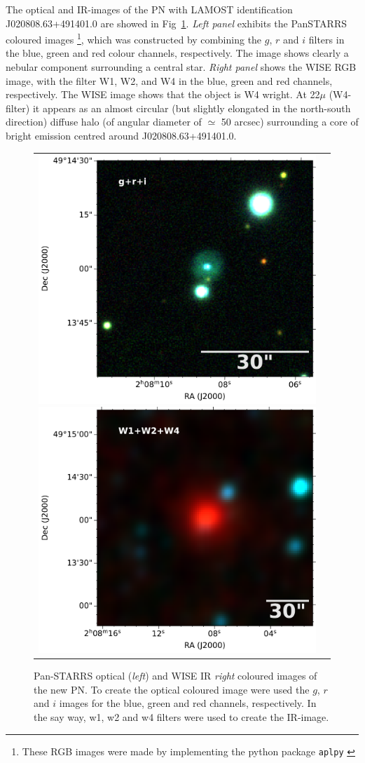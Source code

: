 \documentclass[fleqn,usenatbib]{mnras}
\begin{document}
The optical and IR-images of the PN with LAMOST identification J020808.63+491401.0
are showed in Fig~\ref{fig:image}.
\textit{Left panel} exhibits the PanSTARRS coloured
images \footnote{These RGB images were made by implementing
the python package \texttt{aplpy} \citep{aplpy:2019}}, which
was constructed by combining the $g$, $r$ and $i$ filters in
the blue, green and red colour channels, respectively.
The image shows clearly a nebular component surrounding 
a central star. \textit{Right panel} shows the
WISE RGB image, with the filter W1, W2, and W4 in
the blue, green and red channels, respectively.
The WISE image shows that the object is W4 wright.  
At 22$\mu$ (W4-filter) it appears as an almost
circular (but slightly elongated in the north-south direction)
diffuse halo (of angular diameter of $\simeq$ 50 arcsec) surrounding
a core of bright emission centred around J020808.63+491401.0. 

\begin{figure}
  \centering
  \begin{tabular}{l l}
\includegraphics[width=0.5\linewidth]{Figs/cutout_rings_v3_skycell_2294_031_stk_i_unconv-irg-RGB.pdf}
\includegraphics[width=0.5\linewidth]{Figs/w4_ra32_035994_dec49_233615-421-RGB.pdf}
\end{tabular}  
  \caption{Pan-STARRS optical (\textit{left}) and WISE IR \textit{right} coloured
    images of the new PN. To create the optical coloured image were used the $g$, $r$ and $i$
    images for the blue, green and red channels, respectively. In the say way, w1, w2 and w4
    filters were used to create the IR-image.} 
  \label{fig:image}
\end{figure}
\end{document}
